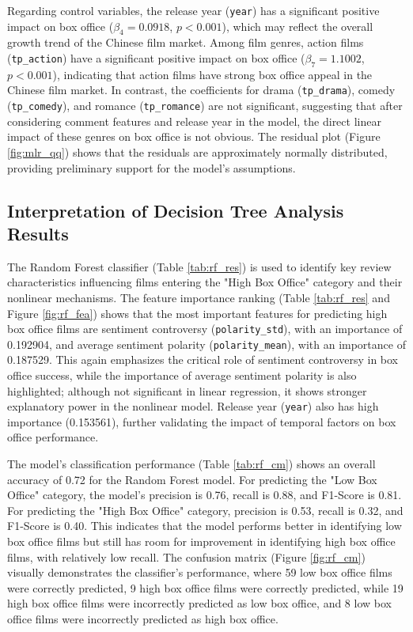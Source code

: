 \documentclass{article}
\begin{document}
Regarding control variables, the release year (\texttt{year}) has a significant positive impact on box office ($\beta_4 = 0.0918$, \(p < 0.001\)), which may reflect the overall growth trend of the Chinese film market. Among film genres, action films (\texttt{tp\_action}) have a significant positive impact on box office ($\beta_7 = 1.1002$, \(p < 0.001\)), indicating that action films have strong box office appeal in the Chinese film market. In contrast, the coefficients for drama (\texttt{tp\_drama}), comedy (\texttt{tp\_comedy}), and romance (\texttt{tp\_romance}) are not significant, suggesting that after considering comment features and release year in the model, the direct linear impact of these genres on box office is not obvious. The residual plot (Figure \ref{fig:mlr_qq}) shows that the residuals are approximately normally distributed, providing preliminary support for the model's assumptions.

\subsection{Interpretation of Decision Tree Analysis Results}
The Random Forest classifier (Table \ref{tab:rf_res}) is used to identify key review characteristics influencing films entering the "High Box Office" category and their nonlinear mechanisms. The feature importance ranking (Table \ref{tab:rf_res} and Figure \ref{fig:rf_fea}) shows that the most important features for predicting high box office films are sentiment controversy (\texttt{polarity\_std}), with an importance of 0.192904, and average sentiment polarity (\texttt{polarity\_mean}), with an importance of 0.187529. This again emphasizes the critical role of sentiment controversy in box office success, while the importance of average sentiment polarity is also highlighted; although not significant in linear regression, it shows stronger explanatory power in the nonlinear model. Release year (\texttt{year}) also has high importance (0.153561), further validating the impact of temporal factors on box office performance.

The model's classification performance (Table \ref{tab:rf_cm}) shows an overall accuracy of 0.72 for the Random Forest model. For predicting the "Low Box Office" category, the model's precision is 0.76, recall is 0.88, and F1-Score is 0.81. For predicting the "High Box Office" category, precision is 0.53, recall is 0.32, and F1-Score is 0.40. This indicates that the model performs better in identifying low box office films but still has room for improvement in identifying high box office films, with relatively low recall. The confusion matrix (Figure \ref{fig:rf_cm}) visually demonstrates the classifier's performance, where 59 low box office films were correctly predicted, 9 high box office films were correctly predicted, while 19 high box office films were incorrectly predicted as low box office, and 8 low box office films were incorrectly predicted as high box office.
\end{document}
